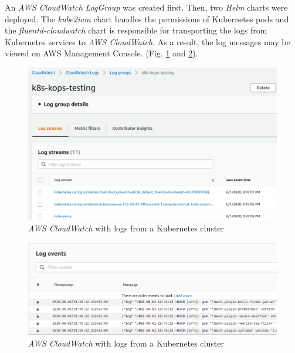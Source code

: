 An \textit{AWS CloudWatch LogGroup} was created first. Then, two \textit{Helm} charts were deployed. The \textit{kube2iam} chart handles the permissions of Kubernetes pods and the \textit{fluentd-cloudwatch} chart is responsible for transporting the logs from Kubernetes services to \textit{AWS CloudWatch}. As a result, the log messages may be viewed on AWS Management Console. (Fig. \ref{fig:cw-kops1} and \ref{fig:cw-kops2}).
\begin{figure}[H]
    \centering
    \includegraphics[width=14cm]{figures/kops-testing-cw-logs-small.png}
    \captionsetup{justification=centering,margin=2cm}
    \caption{\textit{AWS CloudWatch} with logs from a Kubernetes cluster}
    \label{fig:cw-kops1}
\end{figure}
\begin{figure}[H]
    \centering
    \includegraphics[width=16cm]{figures/kops-testing-cw-logs2-small.png}
    \captionsetup{justification=centering,margin=2cm}
    \caption{\textit{AWS CloudWatch} with logs from a Kubernetes cluster}
    \label{fig:cw-kops2}
\end{figure}

